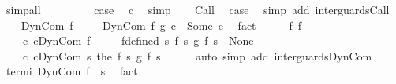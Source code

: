 \begin{isabellebody}
\ {\isacharparenleft}simp{\isacharunderscore}all{\isacharparenright}\isanewline
\ \ \isacommand{{\isacharbraceright}}\isamarkupfalse%
\isanewline
\ \ \isamarkupfalse%
\isanewline
\ \ \isamarkupfalse%
\ {\isacharquery}case\ \isamarkupfalse%
\ c\ \isamarkupfalse%
\ simp\isanewline
{}\isamarkupfalse%
\isanewline
\ \ \isamarkupfalse%
\ Call\ \isamarkupfalse%
\ {\isacharquery}case\ \isamarkupfalse%
\ {\isacharparenleft}simp\ add{\isacharcolon}\ inter{\isacharunderscore}guards{\isacharunderscore}Call{\isacharparenright}\isanewline
{}\isamarkupfalse%
\isanewline
\ \ \isamarkupfalse%
\ {\isacharparenleft}DynCom\ f{}{\isacharparenright}\ \isanewline
\ \ \isamarkupfalse%
\ {\isachardoublequoteopen}{\isacharparenleft}DynCom\ f{}\ {\isasyminter}\isactrlsub g\ c{}{\isacharparenright}\ {\isacharequal}\ Some\ c{\isachardoublequoteclose}\ \isamarkupfalse%
\ fact\isanewline
\ \ \isamarkupfalse%
\ \isamarkupfalse%
\ f{}\ f\ \isanewline
\ \ \ \ c{}{\isacharcolon}\ {\isachardoublequoteopen}c{}{\isacharequal}DynCom\ f{}{\isachardoublequoteclose}\ \isanewline
\ \ \ \ f{\isacharunderscore}defined{\isacharcolon}\ {\isachardoublequoteopen}{\isasymforall}s{\isachardot}\ {\isacharparenleft}{\isacharparenleft}f{}\ s{\isacharparenright}\ {\isasyminter}\isactrlsub g\ {\isacharparenleft}f{}\ s{\isacharparenright}{\isacharparenright}\ {\isasymnoteq}\ None{\isachardoublequoteclose}\ \isanewline
\ \ \ \ c{\isacharcolon}\ {\isachardoublequoteopen}c{\isacharequal}DynCom\ {\isacharparenleft}{\isasymlambda}s{\isachardot}\ the\ {\isacharparenleft}{\isacharparenleft}f{}\ s{\isacharparenright}\ {\isasyminter}\isactrlsub g\ {\isacharparenleft}f{}\ s{\isacharparenright}{\isacharparenright}{\isacharparenright}{\isachardoublequoteclose}\isanewline
\ \ \ \ \isamarkupfalse%
\ {\isacharparenleft}auto\ simp\ add{\isacharcolon}\ inter{\isacharunderscore}guards{\isacharunderscore}DynCom{\isacharparenright}\isanewline
\ \ \isamarkupfalse%
\ termi{\isacharcolon}\ {\isachardoublequoteopen}{\isasymGamma}{\isasymturnstile}DynCom\ f{}\ {\isasymdown}\ s{\isachardoublequoteclose}\ \isamarkupfalse%
\ fact\isanewline
\ \ \isamarkupfalse%

\end{isabellebody}
